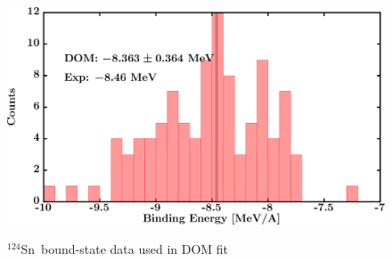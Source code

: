 \documentclass[twocolumn,secnumarabic,amssymb, nobibnotes, aps, prl,
superscriptaddress, nobalancelastpage, draft]{revtex4}
\newcommand{\snFour}{\ensuremath{^{124}}S\lowercase{n}}
\begin{document}
\begin{figure}[!htb]
\begin{minipage}{0.4\linewidth}
        \label{DOM_sn124_RMSRadius}
    \end{minipage}
    \begin{minipage}{0.4\linewidth}
        \centering
        \includegraphics[width=\linewidth]{figures/sn124_BE.png}
        \label{DOM_sn124_BE}
    \end{minipage}
    \caption{\snFour\ bound-state data used in DOM fit}
    \label{DOM_sn124_structural}
\end{figure}
\end{document}
